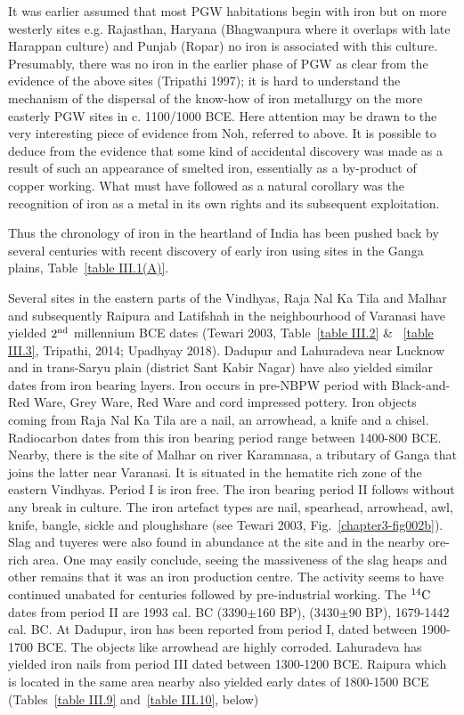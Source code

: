It was earlier assumed that most PGW habitations begin with iron but on more westerly sites e.g. Rajasthan, Haryana (Bhagwanpura where it overlaps with late Harappan culture) and Punjab (Ropar) no iron is associated with this culture. Presumably, there was no iron in the earlier phase of PGW as clear from the evidence of the above sites (Tripathi 1997); it is hard to understand the mechanism of the dispersal of the know-how of iron metallurgy on the more easterly PGW sites in c. 1100/1000 BCE. Here attention may be drawn to the very interesting piece of evidence from Noh, referred to above. It is possible to deduce from the evidence that some kind of accidental discovery was made as a result of such an appearance of smelted iron, essentially as a by-product of copper working. What must have followed as a natural corollary was the recognition of iron as a metal in its own rights and its subsequent exploitation.

Thus the chronology of iron in the heartland of India has been pushed back by several centuries with recent discovery of early iron using sites in the Ganga plains, Table~\ref{table III.1(A)}.

Several sites in the eastern parts of the Vindhyas, Raja Nal Ka Tila and Malhar and subsequently Raipura and Latifshah in the neighbourhood of  Varanasi have yielded $2^{\rm nd}$ millennium BCE dates (Tewari 2003, Table~\ref{table III.2} \& ~\ref{table III.3}, Tripathi, 2014; Upadhyay 2018). Dadupur and Lahuradeva near Lucknow and in trans-Saryu plain (district Sant Kabir Nagar) have also yielded similar dates from iron bearing layers. Iron occurs in pre-NBPW period with Black-and-Red Ware, Grey Ware, Red Ware and cord impressed pottery. Iron objects coming from Raja Nal Ka Tila are a nail, an arrowhead, a knife and a chisel. Radiocarbon dates from this iron bearing period range between 1400-800 BCE. Nearby, there is the site of Malhar on river Karamnasa, a tributary of Ganga that joins the latter near Varanasi. It is situated in the hematite rich zone of the eastern Vindhyas. Period I is iron free. The iron bearing period II follows without any break in culture. The iron artefact types are nail, spearhead, arrowhead, awl, knife, bangle, sickle and ploughshare (see Tewari 2003, Fig.~\ref{chapter3-fig002b}). Slag and tuyeres were also found in abundance at the site and in the nearby ore-rich area. One may easily conclude, seeing the massiveness of the slag heaps and other remains that it was an iron production centre. The activity seems to have continued unabated for centuries followed by pre-industrial working. The $^{14}{\rm C}$ dates from period II are 1993 cal. BC (3390$\pm$160 BP), (3430$\pm$90 BP), 1679-1442 cal. BC. At Dadupur, iron has been reported from period I, dated between 1900-1700 BCE. The objects like arrowhead are highly corroded. Lahuradeva has yielded iron nails from period III dated between 1300-1200 BCE. Raipura which is located in the same area nearby also yielded early dates of 1800-1500 BCE (Tables~\ref{table III.9} and~\ref{table III.10}, below)

